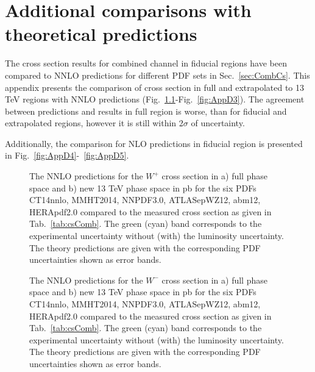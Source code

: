 \chapter{Additional comparisons with theoretical predictions}\label{app:NLO}

The cross section results for combined channel in fiducial regions have been compared to NNLO predictions for different PDF sets in Sec.~\ref{sec:CombCs}. This appendix presents the comparison of cross section in full and extrapolated to 13 TeV regions with NNLO predictions (Fig.~\ref{fig:AppD1}-Fig.~\ref{fig:AppD3}). The agreement between predictions and results in full region is worse, than for fiducial and extrapolated regions, however it is still within 2$\sigma$ of uncertainty. 

Additionally, the comparison for NLO predictions in fiducial region is presented in Fig.~\ref{fig:AppD4}-~\ref{fig:AppD5}.

\begin{figure}[!h]
\begin{minipage}[h]{0.49\linewidth}
\end{minipage}
\hfill
\begin{minipage}[h]{0.49\linewidth}
\end{minipage}
\caption{The NNLO predictions for the $W^{+}$ cross section in a) full phase space and  b) new 13 TeV phase space in pb for the six PDFs CT14nnlo, MMHT2014, NNPDF3.0, ATLASepWZ12, abm12, HERApdf2.0 compared to the measured cross section as given in Tab.~\ref{tab:csComb}. The green (cyan) band corresponds to the experimental uncertainty without (with) the luminosity uncertainty. The theory predictions are given with the corresponding PDF uncertainties shown as error bands.}
\label{fig:AppD1}
\end{figure}


\begin{figure}[!h]
\begin{minipage}[h]{0.49\linewidth}
\end{minipage}
\hfill
\begin{minipage}[h]{0.49\linewidth}
\end{minipage}
\caption{The NNLO predictions for the $W^{-}$ cross section in a) full phase space and  b) new 13 TeV phase space in pb for the six PDFs CT14nnlo, MMHT2014, NNPDF3.0, ATLASepWZ12, abm12, HERApdf2.0 compared to the measured cross section as given in Tab.~\ref{tab:csComb}. The green (cyan) band corresponds to the experimental uncertainty without (with) the luminosity uncertainty. The theory predictions are given with the corresponding PDF uncertainties shown as error bands.}
\label{fig:AppD2}
\end{figure}

